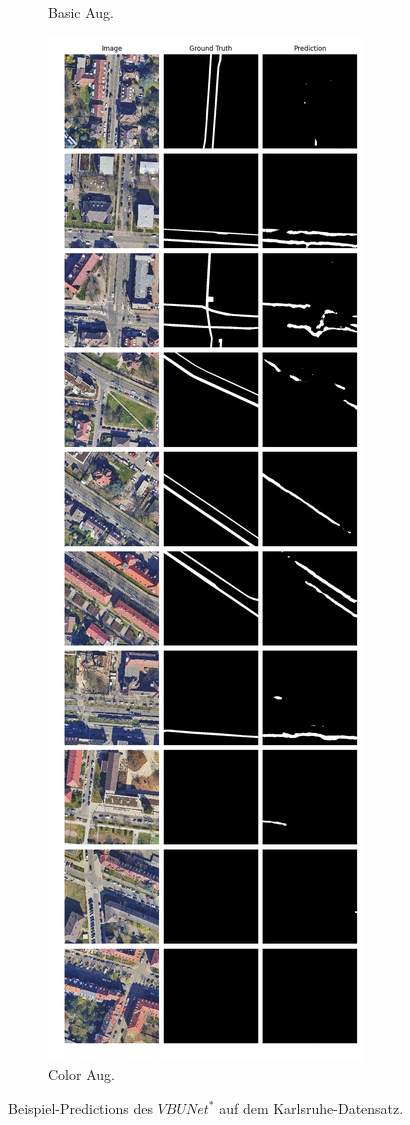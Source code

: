 \begin{figure}
\begin{subfigure}{.4\textwidth}
		\caption{Basic Aug.}
	\end{subfigure}
	\begin{subfigure}{.4\textwidth}
		\centering
		\includegraphics[width=1.\textwidth]{Bilder/karlsruhe-color-samples/vbunet-s.png}
		\caption{Color Aug.}
	\end{subfigure}
	\caption{Beispiel-Predictions des $VBUNet^*$ auf dem Karlsruhe-Datensatz.}
	\label{fig:ka-samples-vbunet-s}
	\end{figure}